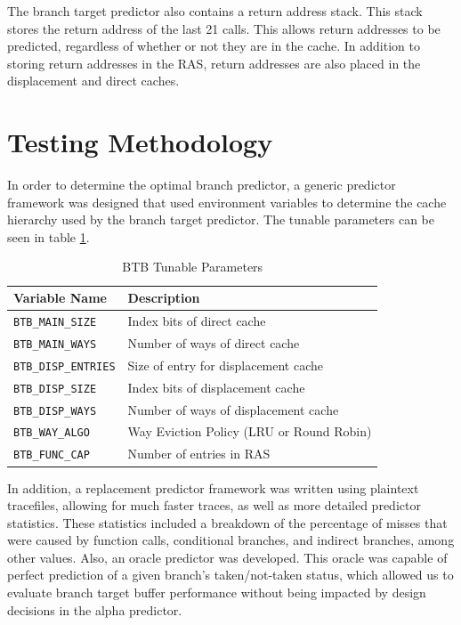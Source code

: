 \documentclass[twocolumn]{article}
\begin{document}
The branch target predictor also contains a return address stack. This
stack stores the return address of the last 21 calls. This allows
return addresses to be predicted, regardless of whether or not they
are in the cache. In addition to storing return addresses in the RAS,
return addresses are also placed in the displacement and direct
caches.

\section{Testing Methodology}

In order to determine the optimal branch predictor, a generic
predictor framework was designed that used environment variables to
determine the cache hierarchy used by the branch target predictor.
The tunable parameters can be seen in table \ref{envars}. 

\begin{table}
\begin{center}\begin{tabular}{p{}p{}}
Variable Name & Description \\
\hline
\texttt{BTB\_MAIN\_SIZE} & Index bits of direct cache \\
\texttt{BTB\_MAIN\_WAYS} & Number of ways of direct cache \\
\texttt{BTB\_DISP\_ENTRIES} & Size of entry for displacement cache \\
\texttt{BTB\_DISP\_SIZE} & Index bits of displacement cache \\
\texttt{BTB\_DISP\_WAYS} & Number of ways of displacement cache \\
\texttt{BTB\_WAY\_ALGO} & Way Eviction Policy (LRU or Round Robin) \\
\texttt{BTB\_FUNC\_CAP} & Number of entries in RAS
\end{tabular}\end{center}
\caption{BTB Tunable Parameters}
\label{envars}
\end{table}

In addition, a replacement predictor framework was written using
plaintext tracefiles, allowing for much faster traces, as well as more
detailed predictor statistics. These statistics included a breakdown
of the percentage of misses that were caused by function calls,
conditional branches, and indirect branches, among other values. Also,
an oracle predictor was developed. This oracle was capable of perfect
prediction of a given branch's taken/not-taken status, which allowed
us to evaluate branch target buffer performance without being impacted
by design decisions in the alpha predictor. 
\end{document}
